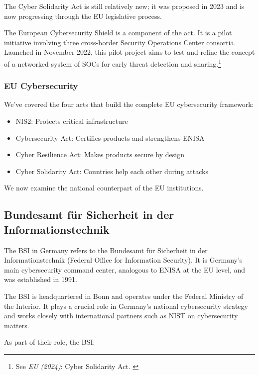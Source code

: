 The Cyber Solidarity Act is still relatively new; it was proposed in 2023 and is now progressing through the EU legislative process.

The European Cybersecurity Shield is a component of the act. It is a pilot initiative involving three cross-border Security Operations Center consortia. Launched in November 2022, this pilot project aims to test and refine the concept of a networked system of SOCs for early threat detection and sharing.\footnote{See \textit{EU (2024)}: Cyber Solidarity Act. \cite{cyberSol}}

\subsubsection{EU Cybersecurity}

We've covered the four acts that build the complete EU cybersecurity framework:

\begin{itemize}
    \item NIS2: Protects critical infrastructure
    \item Cybersecurity Act: Certifies products and strengthens ENISA
    \item Cyber Resilience Act: Makes products secure by design
    \item Cyber Solidarity Act: Countries help each other during attacks
\end{itemize}

We now examine the national counterpart of the EU institutions.

\subsection{Bundesamt für Sicherheit in der Informationstechnik}

The BSI in Germany refers to the Bundesamt für Sicherheit in der Informationstechnik (Federal Office for Information Security). It is Germany's main cybersecurity command center, analogous to ENISA at the EU level, and was established in 1991.

The BSI is headquartered in Bonn and operates under the Federal Ministry of the Interior. It plays a crucial role in Germany's national cybersecurity strategy and works closely with international partners such as NIST on cybersecurity matters.

As part of their role, the BSI:


